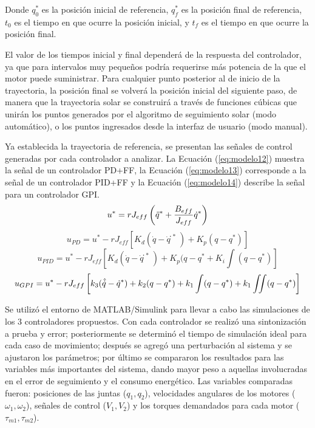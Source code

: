 Donde $ q_0^* $ es la posición inicial de referencia, $ q_f^* $ es la posición final de referencia, $ t_0 $ es el tiempo en que ocurre la posición inicial, y $ t_f $ es el tiempo en que ocurre la posición final.

El valor de los tiempos inicial y final dependerá de la respuesta del controlador, ya que para intervalos muy pequeños podría requerirse más potencia de la que el motor puede suministrar. Para cualquier punto posterior al de inicio de la trayectoria, la posición final se volverá la posición inicial del siguiente paso, de manera que la trayectoria solar se construirá a través de funciones cúbicas que unirán los puntos generados por el algoritmo de seguimiento solar (modo automático), o los puntos ingresados desde la interfaz de usuario (modo manual).

Ya establecida la trayectoria de referencia, se presentan las señales de control generadas por cada controlador a analizar. La Ecuación (\ref{eq:modelo12}) muestra la señal de un controlador PD+FF, la Ecuación (\ref{eq:modelo13}) corresponde a la señal de un controlador PID+FF y la Ecuación (\ref{eq:modelo14}) describe la señal para un controlador GPI.
\begin{equation}
    u^*=rJ_{eff} \left(\Ddot{q}^*+\frac{B_{eff}}{J_{eff}}  \Dot{q}^*\right)
\end{equation}
\begin{equation} \label{eq:modelo12}
    u_{PD}=u^*-rJ_{eff} [K_d (\Dot{q} -\Dot{q}̇^* )+K_p (q-q^* )]
\end{equation}
\begin{equation} \label{eq:modelo13}
    u_{PID}=u^*-rJ_{eff} \left[K_d (\Dot{q} -\Dot{q}̇^* )+K_p (q-q^* +K_i \int(q-q^* ) \right]
\end{equation}
\begin{equation} \label{eq:modelo14}
    u_{GPI}=u^*-rJ_{eff} \left[k_3 (\Hat{\Dot{q}}- \Dot{q}^*)+k_2 (q-q^* )+k_1 \int(q-q^* ) +k_1 \iint(q-q^* ) \right]
\end{equation}

Se utilizó el entorno de MATLAB/Simulink para llevar a cabo las simulaciones de los 3 controladores propuestos. Con cada controlador se realizó una sintonización a prueba y error; posteriormente se determinó el tiempo de simulación ideal para cada caso de movimiento; después se agregó una perturbación al sistema y se ajustaron los parámetros; por último se compararon los resultados para las variables más importantes del sistema, dando mayor peso a aquellas involucradas en el error de seguimiento y el consumo energético. Las variables comparadas fueron: posiciones de las juntas ($ q_1,q_2 $), velocidades angulares de los motores ($ \omega_1,\omega_2 $), señales de control ($ V_1,V_2 $) y los torques demandados para cada motor ($ \tau_{m1},\tau_{m2} $). 

